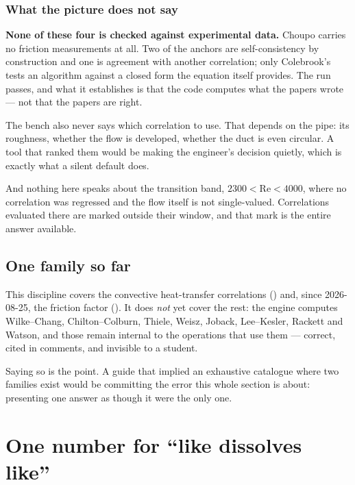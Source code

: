 \documentclass[11pt,a4paper]{article}
\begin{document}
\subsubsection*{What the picture does not say}

\textbf{None of these four is checked against experimental data.}  Choupo
carries no friction measurements at all.  Two of the anchors are
self-consistency by construction and one is agreement with another
correlation; only Colebrook's tests an algorithm against a closed form the
equation itself provides.  The run passes, and what it establishes is that
the code computes what the papers wrote --- not that the papers are right.

The bench also never says which correlation to use.  That depends on the
pipe: its roughness, whether the flow is developed, whether the duct is
even circular.  A tool that ranked them would be making the engineer's
decision quietly, which is exactly what a silent default does.

And nothing here speaks about the transition band,
$2300 < \mathrm{Re} < 4000$, where no correlation was regressed and the
flow itself is not single-valued.  Correlations evaluated there are marked
outside their window, and that mark is the entire answer available.

\subsection{One family so far}

This discipline covers the convective heat-transfer correlations
() and, since 2026-08-25, the friction factor
().  It does \emph{not} yet cover the rest: the engine
computes Wilke--Chang, Chilton--Colburn, Thiele, Weisz, Joback,
Lee--Kesler, Rackett and Watson, and those remain internal to the
operations that use them --- correct, cited in comments, and invisible to a
student.

Saying so is the point.  A guide that implied an exhaustive catalogue
where two families exist would be committing the error this whole section
is about: presenting one answer as though it were the only one.

\section{One number for ``like dissolves like''}
\label{sec:edu-solubility}
\end{document}

